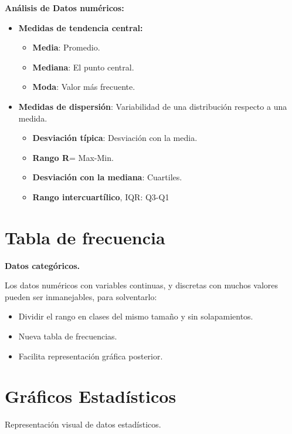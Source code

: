 \documentclass[12pt, twoside, openright]{report} %
\begin{document}
\textbf{Análisis de Datos numéricos:}

\begin{itemize}
	\item \textbf{Medidas de tendencia central:}

	      \begin{itemize}
		      \item \textbf{Media}: Promedio.
		      \item \textbf{Mediana}: El punto central.
		      \item \textbf{Moda}: Valor más frecuente.
	      \end{itemize}
	\item \textbf{Medidas de dispersión}: Variabilidad de una distribución
	      respecto a una medida.

	      \begin{itemize}
		      \item \textbf{Desviación típica}: Desviación con la media.
		      \item \textbf{Rango R}= Max-Min.
		      \item \textbf{Desviación con la mediana}: Cuartiles.
		      \item \textbf{Rango intercuartílico}, IQR: Q3-Q1
	      \end{itemize}
\end{itemize}

\section{Tabla de frecuencia}

\textbf{Datos categóricos.}

Los datos numéricos con variables continuas, y discretas con muchos
valores pueden ser inmanejables, para solventarlo:

\begin{itemize}
	\item Dividir el rango en clases del mismo tamaño y sin solapamientos.
	\item Nueva tabla de frecuencias.
	\item Facilita representación gráfica posterior.
\end{itemize}

\section{Gráficos Estadísticos}

Representación visual de datos estadísticos.
\end{document}

